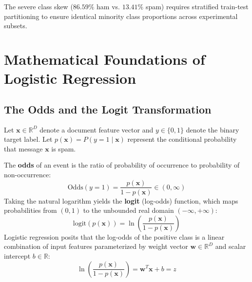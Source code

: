 \documentclass[12pt]{article}
\begin{document}
The severe class skew ($86.59\%$ ham vs. $13.41\%$ spam) requires stratified train-test partitioning to ensure identical minority class proportions across experimental subsets.

\newpage
\section{Mathematical Foundations of Logistic Regression}

\subsection{The Odds and the Logit Transformation}
Let $\mathbf{x} \in \mathbb{R}^D$ denote a document feature vector and $y \in \{0, 1\}$ denote the binary target label. Let $p(\mathbf{x}) = P(y = 1 \mid \mathbf{x})$ represent the conditional probability that message $\mathbf{x}$ is spam. 

The \textbf{odds} of an event is the ratio of probability of occurrence to probability of non-occurrence:
\begin{equation}
    \text{Odds}(y = 1) = \frac{p(\mathbf{x})}{1 - p(\mathbf{x})} \in (0, \infty)
\end{equation}
Taking the natural logarithm yields the \textbf{logit} (log-odds) function, which maps probabilities from $(0, 1)$ to the unbounded real domain $(-\infty, +\infty)$:
\begin{equation}
    \text{logit}(p(\mathbf{x})) = \ln\left( \frac{p(\mathbf{x})}{1 - p(\mathbf{x})} \right)
\end{equation}
Logistic regression posits that the log-odds of the positive class is a linear combination of input features parameterized by weight vector $\mathbf{w} \in \mathbb{R}^D$ and scalar intercept $b \in \mathbb{R}$:
\begin{equation}
    \ln\left( \frac{p(\mathbf{x})}{1 - p(\mathbf{x})} \right) = \mathbf{w}^T \mathbf{x} + b = z
\end{equation}
\end{document}
